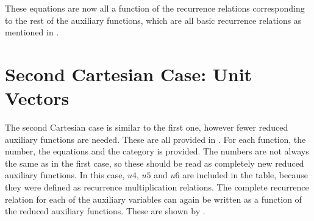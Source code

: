 \noindent
These equations are now all a function of the recurrence relations corresponding to the rest of the auxiliary functions, which are all basic recurrence relations as mentioned in . \\



\section{Second Cartesian Case: Unit Vectors}
\label{sec:secCartApp}
The second Cartesian case is similar to the first one, however fewer reduced auxiliary functions are needed. These are all provided in . For each function, the number, the equations and the category is provided. The numbers are not always the same as in the first case, so these should be read as completely new reduced auxiliary functions. In this case, $u4$, $u5$ and $u6$ are included in the table, because they were defined as recurrence multiplication relations. The complete recurrence relation for each of the auxiliary variables can again be written as a function of the reduced auxiliary functions. These are shown by .

